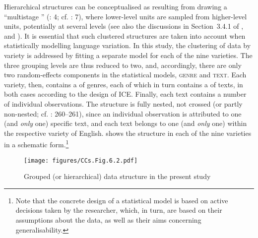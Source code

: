 Hierarchical structures can be conceptualised as resulting from drawing a “multistage ” (\citealt{Hox2010}: 4; cf. \citealt{GelmanHill2007}: 7), where lower-level units are sampled from higher-level units, potentially at several levels (see also the discussions in Section~3.4.1 of \citealt{Sönning2020}, and \citealt{SönningSchlüter2022}). It is essential that such clustered structures are taken into account when statistically modelling language variation. In this study, the clustering of data by variety is addressed by fitting a separate model for each of the nine varieties. The three grouping levels are thus reduced to two, and, accordingly, there are only two random-effects components in the statistical models, \textsc{genre} and \textsc{text}. Each variety, then, contains a  of genres, each of which in turn contains a  of texts, in both cases according to the design of ICE. Finally, each text contains a number of individual observations. The structure is fully nested, not crossed (or partly non-nested; cf. \citealt{Baayen2008}: 260–261), since an individual observation is attributed to one (and \textit{only} one) specific text, and each text belongs to one (and \textit{only} one)  within the respective variety of English.  shows the  structure in each of the nine varieties in a schematic form.{\footnote{Note that the concrete design of a statistical model is based on active decisions taken by the researcher, which, in turn, are based on their assumptions about the data, as well as their aims concerning generalisability.}}

\begin{figure}
\texttt{[image: figures/CCs.Fig.6.2.pdf]}
\caption{\label{bkm:Ref37231385}\label{fig:6.2}Grouped (or hierarchical) data structure in the present study}
\end{figure}

